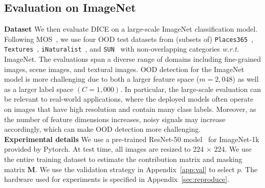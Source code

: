 \documentclass[runningheads]{llncs}
\def\*#1{\mathbf{#1}}
\begin{document}
\subsection{Evaluation on ImageNet}
\label{sec:imagenet}

\noindent \textbf{Dataset} We then evaluate DICE on a large-scale ImageNet classification model. Following MOS~\cite{huang2021mos}, we use four OOD test datasets from (subsets of) \texttt{Places365}~\cite{zhou2017places}, \texttt{Textures}~\cite{cimpoi2014describing}, \texttt{iNaturalist}~\cite{inat}, and \texttt{SUN}~\cite{sun} with non-overlapping categories \emph{w.r.t.} ImageNet. The evaluations span a diverse range of domains including fine-grained images, scene images, and textural images. OOD detection for the ImageNet model is more challenging due to both a larger feature space ($m=2,048$) as well as a larger label space $(C=1,000)$. In particular, the large-scale evaluation can be relevant to real-world applications, where the deployed models often operate on images that have high resolution and contain many class labels. Moreover, as the number of feature dimensions increases, noisy signals may increase accordingly, which can make OOD detection more challenging.  \\

\noindent \textbf{Experimental details} 
We use a pre-trained ResNet-50 model~\cite{he2016identity} for ImageNet-1k provided by Pytorch.
At test time, all images are resized to 224 $\times$ 224. We use the entire training dataset to estimate the contribution matrix and masking matrix $\*M$. We use the validation strategy in Appendix~\ref{app:val} to select $p$.
The hardware used for experiments is specified in Appendix~\ref{sec:reproduce}. \\
\end{document}
